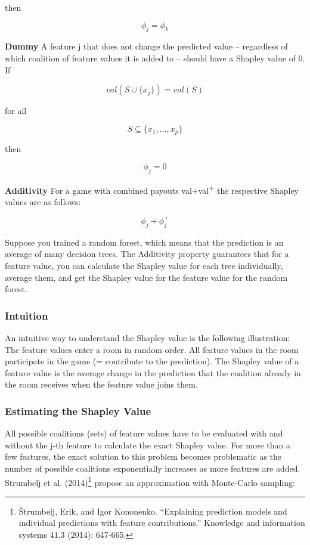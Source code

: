 \documentclass[12pt,]{krantz}
\begin{document}
then

\[\phi_j=\phi_{k}\]

\textbf{Dummy} A feature j that does not change the predicted value --
regardless of which coalition of feature values it is added to -- should
have a Shapley value of 0. If

\[val(S\cup\{x_j\})=val(S)\]

for all

\[S\subseteq\{x_{1},\ldots,x_{p}\}\]

then

\[\phi_j=0\]

\textbf{Additivity} For a game with combined payouts
val+val\textsuperscript{+} the respective Shapley values are as follows:

\[\phi_j+\phi_j^{+}\]

Suppose you trained a random forest, which means that the prediction is
an average of many decision trees. The Additivity property guarantees
that for a feature value, you can calculate the Shapley value for each
tree individually, average them, and get the Shapley value for the
feature value for the random forest.

\subsubsection{Intuition}\label{intuition}

An intuitive way to understand the Shapley value is the following
illustration: The feature values enter a room in random order. All
feature values in the room participate in the game (= contribute to the
prediction). The Shapley value of a feature value is the average change
in the prediction that the coalition already in the room receives when
the feature value joins them.

\subsubsection{Estimating the Shapley
Value}\label{estimating-the-shapley-value}

All possible coalitions (sets) of feature values have to be evaluated
with and without the j-th feature to calculate the exact Shapley value.
For more than a few features, the exact solution to this problem becomes
problematic as the number of possible coalitions exponentially increases
as more features are added. Strumbelj et al. (2014)\footnote{Štrumbelj,
  Erik, and Igor Kononenko. ``Explaining prediction models and
  individual predictions with feature contributions.'' Knowledge and
  information systems 41.3 (2014): 647-665.} propose an approximation
with Monte-Carlo sampling:
\end{document}
